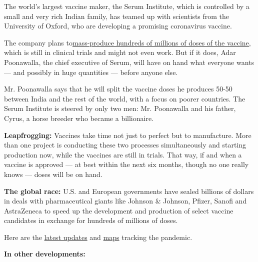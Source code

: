 The world's largest vaccine maker, the Serum Institute, which is
controlled by a small and very rich Indian family, has teamed up with
scientists from the University of Oxford, who are developing a promising
coronavirus vaccine.

The company plans
to\href{https://www.nytimes.com/2020/08/01/world/asia/coronavirus-vaccine-india.html}{mass-produce
hundreds of millions of doses of the vaccine,} which is still in
clinical trials and might not even work. But if it does, Adar
Poonawalla, the chief executive of Serum, will have on hand what
everyone wants --- and possibly in huge quantities --- before anyone
else.

Mr. Poonawalla says that he will split the vaccine doses he produces
50-50 between India and the rest of the world, with a focus on poorer
countries. The Serum Institute is steered by only two men: Mr.
Poonawalla and his father, Cyrus, a horse breeder who became a
billionaire.

\textbf{Leapfrogging:} Vaccines take time not just to perfect but to
manufacture. More than one project is conducting these two processes
simultaneously and starting production now, while the vaccines are still
in trials. That way, if and when a vaccine is approved --- at best
within the next six months, though no one really knows --- doses will be
on hand.

\textbf{The global race:} U.S. and European governments have sealed
billions of dollars in deals with pharmaceutical giants like Johnson \&
Johnson, Pfizer, Sanofi and AstraZeneca to speed up the development and
production of select vaccine candidates in exchange for hundreds of
millions of doses.

Here are the
\href{https://www.nytimes.com/2020/08/02/world/coronavirus-covid-19.html}{latest
updates} and
\href{https://www.nytimes.com/interactive/2020/world/coronavirus-maps.html}{maps}
tracking the pandemic.

\textbf{In other developments:}

